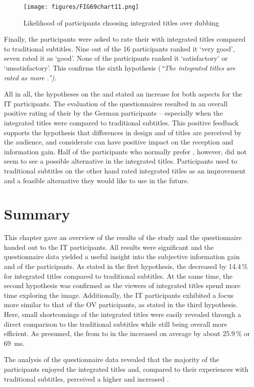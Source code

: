 \begin{figure}
\texttt{[image: figures/FIG69chart11.png]}
\caption{Likelihood of participants choosing integrated titles over dubbing}
\label{fig:FIG69}
\end{figure}


Finally, the participants were asked to rate their  with integrated titles compared to traditional subtitles. Nine out of the 16 participants ranked it ‘very good’, seven rated it as ‘good’. None of the participants ranked it ‘satisfactory’ or ‘unsatisfactory’. This confirms the sixth hypothesis (\textit{“The integrated titles are rated as more .”).}


All in all, the hypotheses on the  and  stated an increase for both aspects for the IT participants. The evaluation of the questionnaires resulted in an overall positive rating of their  by the German participants – especially when the integrated titles were compared to traditional subtitles. This positive feedback supports the hypothesis that differences in design and  of titles are perceived by the audience, and considerate  can have positive impact on the reception and information gain. Half of the participants who normally prefer , however, did not seem to see a possible alternative in the integrated titles. Participants used to traditional subtitles on the other hand rated integrated titles as an improvement and a feasible alternative they would like to use in the future.

\section{Summary}\label{sec:8.3}

This chapter gave an overview of the results of the  study and the questionnaire handed out to the IT participants. All  results were significant and the questionnaire data yielded a useful insight into the subjective information gain and  of the participants. As stated in the first hypothesis, the  decreased by 14.4\,\% for integrated titles compared to traditional subtitles. At the same time, the second hypothesis was confirmed as the viewers of integrated titles spend more time exploring the image. Additionally, the IT participants exhibited a focus more similar to that of the OV participants, as stated in the third hypothesis. Here, small shortcomings of the integrated titles were easily revealed through a direct comparison to the traditional subtitles while still being overall more efficient. As presumed, the  from  to  in the  increased on average by about 25.9\,\% or 69~ms.

The analysis of the questionnaire data revealed that the majority of the participants enjoyed the integrated titles and, compared to their experiences with traditional subtitles, perceived a higher  and increased .